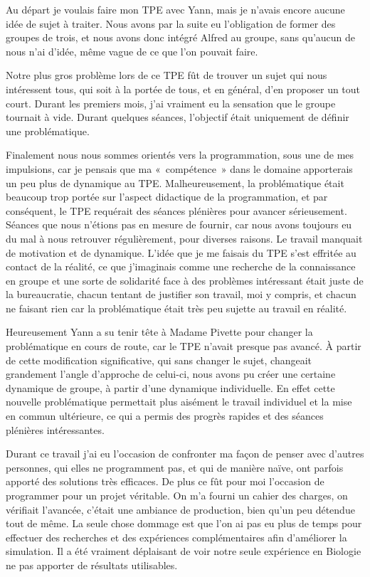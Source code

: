 Au départ je voulais faire mon TPE avec Yann, mais je n'avais encore aucune idée de sujet à traiter. Nous avons par la suite eu l'obligation de former des groupes de trois, et nous avons donc intégré Alfred au groupe, sans qu'aucun de nous n'ai d'idée, même vague de ce que l'on pouvait faire.

Notre plus gros problème lors de ce TPE fût de trouver un sujet qui nous intéressent tous, qui soit à la portée de tous, et en général, d'en proposer un tout court. Durant les premiers mois, j'ai vraiment eu la sensation que le groupe tournait à vide. Durant quelques séances, l'objectif était uniquement de définir une problématique. 

  Finalement nous nous sommes orientés vers la programmation, sous une de mes impulsions, car je pensais que ma «~compétence~» dans le domaine apporterais un peu plus de dynamique au TPE. Malheureusement, la problématique était beaucoup trop portée sur l'aspect didactique de la programmation, et par conséquent, le TPE requérait des séances plénières pour avancer sérieusement. Séances que nous n'étions pas en mesure de fournir, car nous avons toujours eu du mal à nous retrouver régulièrement, pour diverses raisons. Le travail manquait de motivation et de dynamique. L'idée que je me faisais du TPE s'est effritée au contact de la réalité, ce que j'imaginais comme une recherche de la connaissance en groupe et une sorte de solidarité face à des problèmes intéressant était juste de la bureaucratie, chacun tentant de justifier son travail, moi y compris, et chacun ne faisant rien car la problématique était très peu sujette au travail en réalité.
  
  Heureusement Yann a su tenir tête à Madame Pivette pour changer la problématique en cours de route, car le TPE n'avait presque pas avancé. À partir de cette modification significative, qui sans changer le sujet, changeait grandement l'angle d'approche de celui-ci, nous avons pu créer une certaine dynamique de groupe, à partir d'une dynamique individuelle. En effet cette nouvelle problématique permettait plus aisément le travail individuel et la mise en commun ultérieure, ce qui a permis des progrès rapides et des séances plénières intéressantes.
  
  Durant ce travail j'ai eu l'occasion de confronter ma façon de penser avec d'autres personnes, qui elles ne programment pas, et qui de manière naïve, ont parfois apporté des solutions très efficaces. De plus ce fût pour moi l'occasion de programmer pour un projet véritable. On m'a fourni un cahier des charges, on vérifiait l'avancée, c'était une ambiance de production, bien qu'un peu détendue tout de même. La seule chose dommage est que l'on ai pas eu plus de temps pour effectuer des recherches et des expériences complémentaires afin d'améliorer la simulation. Il a été vraiment déplaisant de voir notre seule expérience en Biologie ne pas apporter de résultats utilisables. 
  

